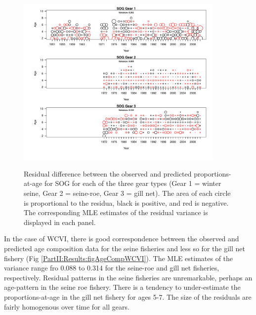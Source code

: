 \begin{figure}
	\centering
	\includegraphics[width=0.9\textwidth]{../FIGS/qPriorFigs/iscam_fig_agecompsresid_SOG.pdf}\\
	\caption{Residual difference between the observed and predicted proportions-at-age for SOG for each of the three gear types (Gear 1 = winter seine, Gear 2 = seine-roe, Gear 3 = gill net).  The area of each circle is proportional to the residua, black is positive, and red is negative.  The corresponding MLE estimates of the residual variance is displayed in each panel.}\label{PartII:Results:figAgeCompSOG}
\end{figure}

In the case of WCVI, there is good correspondence between the observed and predicted age composition data for the seine fisheries and less so for the gill net fishery (Fig \ref{PartII:Results:figAgeCompWCVI}).  The MLE estimates of the variance range fro 0.088 to 0.314 for the seine-roe and gill net fisheries, respectively.  Residual patterns in the seine fisheries are unremarkable, perhaps an age-pattern in the seine roe fishery.  There is a tendency to under-estimate the proportions-at-age in the gill net fishery for ages 5-7.   The size of the residuals are fairly homogenous over time for all gears.


